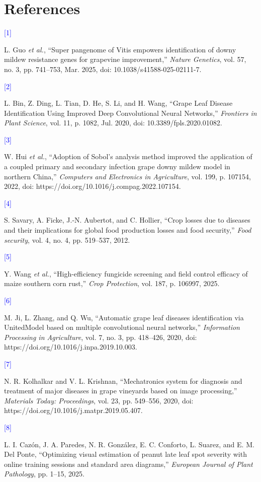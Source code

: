 \documentclass[
]{article}
\begin{document}
\hypertarget{references}{%
\section*{References}\label{references}}

\hypertarget{ref:1}{\textcolor{blue}{[1]}} L. Guo \emph{et al.}, ``Super pangenome of Vitis empowers
identification of downy mildew resistance genes for grapevine
improvement,'' \emph{Nature Genetics}, vol. 57, no. 3, pp. 741--753,
Mar. 2025, doi: 10.1038/s41588-025-02111-7.

\hypertarget{ref:2}{\textcolor{blue}{[2]}} L. Bin, Z. Ding, L.
Tian, D. He, S. Li, and H. Wang, ``Grape Leaf Disease Identification
Using Improved Deep Convolutional Neural Networks,'' \emph{Frontiers in
Plant Science}, vol. 11, p. 1082, Jul. 2020, doi:
10.3389/fpls.2020.01082.

\hypertarget{ref:3}{\textcolor{blue}{[3]}} W. Hui \emph{et al.}, ``Adoption of
Sobol's analysis method improved the application of a coupled primary
and secondary infection grape downy mildew model in northern China,''
\emph{Computers and Electronics in Agriculture}, vol. 199, p. 107154,
2022, doi: https://doi.org/10.1016/j.compag.2022.107154.

\hypertarget{ref:4}{\textcolor{blue}{[4]}} S.
Savary, A. Ficke, J.-N. Aubertot, and C. Hollier, ``Crop losses due to
diseases and their implications for global food production losses and
food security,'' \emph{Food security}, vol. 4, no. 4, pp. 519--537,
2012.

\hypertarget{ref:5}{\textcolor{blue}{[5]}} Y. Wang \emph{et al.}, ``High-efficiency fungicide
screening and field control efficacy of maize southern corn rust,''
\emph{Crop Protection}, vol. 187, p. 106997, 2025.

\hypertarget{ref:6}{\textcolor{blue}{[6]}} M. Ji, L.
Zhang, and Q. Wu, ``Automatic grape leaf diseases identification via
UnitedModel based on multiple convolutional neural networks,''
\emph{Information Processing in Agriculture}, vol. 7, no. 3, pp.
418--426, 2020, doi: https://doi.org/10.1016/j.inpa.2019.10.003.

\hypertarget{ref:7}{\textcolor{blue}{[7]}}N. R. Kolhalkar and V. L. Krishnan, ``Mechatronics system for diagnosis
and treatment of major diseases in grape vineyards based on image
processing,'' \emph{Materials Today: Proceedings}, vol. 23, pp.
549--556, 2020, doi: https://doi.org/10.1016/j.matpr.2019.05.407.

\hypertarget{ref:8}{\textcolor{blue}{[8]}}L. I. Cazón, J. A. Paredes, N. R. González, E. C. Conforto, L. Suarez,
and E. M. Del Ponte, ``Optimizing visual estimation of peanut late leaf
spot severity with online training sessions and standard area
diagrams,'' \emph{European Journal of Plant Pathology}, pp. 1--15,
2025.
\end{document}
